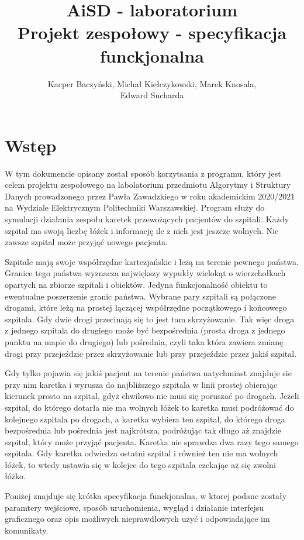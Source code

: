 \documentclass[10pt,a4paper]{article}
\title{\huge AiSD - laboratorium \\ \Large Projekt zespołowy - specyfikacja funckjonalna}
\author{Kacper Baczyński, Michał Kiełczykowski, Marek Knosala, \\ Edward Sucharda}
\begin{document}
\maketitle


\section{Wstęp}

W tym dokumencie opisany został sposób korzytsania z programu, który jest celem projektu zespołowego na labolatorium przedmiotu Algorytmy i Struktury Danych prowadzonego przez Pawła Zawadzkiego w roku akademickim 2020/2021 na Wydziale Elektrycznym Politechniki Warszawskiej. Program służy do symulacji działania zespołu karetek przewożących pacjentów do szpitali. Każdy szpital ma swoją liczbę łóżek i informację ile z nich jest jeszcze wolnych. Nie zawsze szpital może przyjąć nowego pacjenta.

Szpitale mają swoje współrzędne kartezjańskie i leżą na terenie pewnego państwa. Granice tego państwa wyznacza największy wypukły wielokąt o wierzchołkach opartych na zbiorze szpitali i obiektów. Jedyna funkcjonalność obiektu to ewentualne poszerzenie granic państwa. Wybrane pary szpitali są połączone drogami, które leżą na prostej łączącej współrzędne początkowego i końcowego szpitala. Gdy dwie drogi przecinają się to jest tam skrzyżowanie. Tak więc droga z jednego szpitala do drugiego może być bezpośrednia (prosta droga z jednego punktu na mapie do drugiego) lub pośrednia, czyli taka która zawiera zmianę drogi przy przejeździe przez skrzyżowanie lub przy przejeździe przez jakiś szpital.

Gdy tylko pojawia się jakiś pacjent na terenie państwa natychmiast znajduje sie przy nim karetka i wyrusza do najbliższego szpitala w linii prostej obierając kierunek prosto na szpital, gdyż chwilowo nie musi się poruszać po drogach. Jeżeli szpital, do którego dotarła nie ma wolnych łóżek to karetka musi podróżować do kolejnego szpitala po drogach, a karetka wybiera ten szpital, do którego droga bezpośrednia lub pośrednia jest najkrótsza, podróżując tak długo aż znajdzie szpital, który może przyjąć pacjenta. Karetka nie sprawdza dwa razy tego samego szpitala. Gdy karetka odwiedza ostatni szpital i również ten nie ma wolnych łóżek, to wtedy ustawia się w kolejce do tego szpitala czekając aż się zwolni łóżko.

Poniżej znajduje się krótka specyfikacja funckjonalna, w ktorej podane zostały paramtery wejściowe, sposób uruchomienia, wygląd i działanie interfejsu graficznego oraz opis możliwych nieprawdłowych użyć i odpowiadające im komunikaty.
\end{document}
